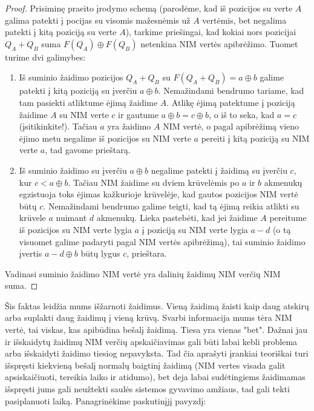 \begin{proof}
  Prisiminę praeito įrodymo schemą (parodėme, kad iš pozicijos su verte $A$
  galima patekti į pocijas su visomis mažesnėmis už $A$ vertėmis, bet
  negalima patekti į kitą poziciją su verte $A$), tarkime priešingai, kad
  kokiai nors pozicijai $Q_A+Q_B$ suma $F(Q_A) \oplus F(Q_B)$ netenkina NIM
  vertės apibrėžimo. Tuomet turime dvi galimybes:

  \begin{enumerate}
    \item Iš suminio žaidimo pozicijos $Q_A+Q_B$ su $F(Q_A+Q_B)=a\oplus b$
      galime patekti į kitą poziciją su įverčiu $a\oplus b$. Nemažindami
      bendrumo tariame, kad tam pasiekti atliktume ėjimą žaidime $A$.
      Atlikę ėjimą patektume į poziciją žaidime $A$ su NIM verte $c$ ir
      gautume $a\oplus b = c\oplus b$, o iš to seka, kad $a=c$
      (įsitikinkite!). Tačiau $a$ yra žaidimo $A$ NIM vertė, o pagal
      apibrėžimą vieno ėjimo metu negalime iš pozicijos su NIM verte $a$
      pereiti į kitą poziciją su NIM verte $a$, tad gavome prieštarą.
    \item Iš suminio žaidimo su įverčiu $a\oplus b$ negalime patekti į
      žaidimą su įverčiu $c$, kur $c < a\oplus b$. Tačiau NIM žaidime su
      dviem krūvelėmis po $a$ ir $b$ akmenukų egzistuoja toks ėjimas
      kažkurioje krūvelėje, kad gautos pozicijos NIM vertė būtų $c$.
      Nemažindami bendrumo galime teigti, kad tą ėjimą reikia atlikti su
      krūvele $a$ nuimant $d$ akmenukų. Lieka pastebėti, kad jei žaidime
      $A$ pereitume iš pozicijos su NIM verte lygia $a$ į poziciją su NIM
      verte lygia $a-d$ (o tą visuomet galime padaryti pagal NIM vertės
      apibrėžimą), tai suminio žaidimo įvertis $a-d\oplus b$ būtų lygus
      $c$, prieštara.
  \end{enumerate}
  Vadinasi suminio žaidimo NIM vertė yra dalinių žaidimų NIM verčių NIM suma.
\end{proof}

Šis faktas leidžia mums išžarnoti žaidimus. Vieną žaidimą žaisti kaip daug
atskirų arba suplakti daug žaidimų į vieną krūvą. Svarbi informacija mums tėra
NIM vertė, tai viskas, kas apibūdina bešalį žaidimą. Tiesa yra vienas "bet".
Dažnai jau ir išskaidytų žaidimų NIM verčių apskaičiavimas gali būti labai
kebli problema arba išskaidyti žaidimo tiesiog nepavyksta. Tad čia aprašyti
įrankiai teoriškai turi išspręsti kiekvieną bešalį normalų baigtinį žaidimą (NIM vertes
visada galit apsiskaičiuoti, tereikia laiko ir atidumo), bet deja labai
sudėtingiems žaidimamas išspręsti jums gali neužtekti saulės sistemos gyvavimo
amžiaus, tad gali tekti pasiplanuoti laiką. Panagrinėkime paskutinįjį
pavyzdį:

